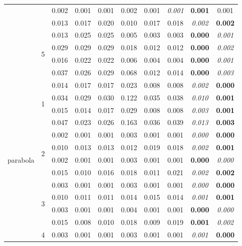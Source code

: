 \documentclass[authoryear, review, 11pt]{elsarticle}
\begin{document}
\begin{table}
\begin{center}
{\begin{tabular}{cccccccccc}
   &  & 0.002 & 0.001 & 0.001 & 0.002 & 0.001 & \emph{0.001} & \textbf{0.001} & 0.001 \\ 
   &  & 0.013 & 0.017 & 0.020 & 0.010 & 0.017 & 0.018 & \emph{0.002} & \textbf{0.002} \\ 
  \cline{3-10}
   & \multirow{4}{*}{5} & 0.013 & 0.025 & 0.025 & 0.005 & 0.003 & 0.003 & \textbf{0.000} & \emph{0.001} \\ 
   &  & 0.029 & 0.029 & 0.029 & 0.018 & 0.012 & 0.012 & \textbf{0.000} & \emph{0.002} \\ 
   &  & 0.016 & 0.022 & 0.022 & 0.006 & 0.004 & 0.004 & \textbf{0.000} & \emph{0.001} \\ 
   &  & 0.037 & 0.026 & 0.029 & 0.068 & 0.012 & 0.014 & \textbf{0.000} & \emph{0.003} \\ 
  \hline
  \multirow{20}{*}{parabola} & \multirow{4}{*}{1} & 0.014 & 0.017 & 0.017 & 0.023 & 0.008 & 0.008 & \emph{0.002} & \textbf{0.000} \\ 
   &  & 0.034 & 0.029 & 0.030 & 0.122 & 0.035 & 0.038 & \emph{0.010} & \textbf{0.001} \\ 
   &  & 0.015 & 0.014 & 0.017 & 0.029 & 0.008 & 0.008 & \emph{0.003} & \textbf{0.001} \\ 
   &  & 0.047 & 0.023 & 0.026 & 0.163 & 0.036 & 0.039 & \emph{0.013} & \textbf{0.003} \\ 
  \cline{3-10}
   & \multirow{4}{*}{2} & 0.002 & 0.001 & 0.001 & 0.003 & 0.001 & 0.001 & \emph{0.000} & \textbf{0.000} \\ 
   &  & 0.010 & 0.013 & 0.013 & 0.012 & 0.019 & 0.018 & \emph{0.002} & \textbf{0.001} \\ 
   &  & 0.002 & 0.001 & 0.001 & 0.003 & 0.001 & 0.001 & \textbf{0.000} & \emph{0.000} \\ 
   &  & 0.015 & 0.010 & 0.016 & 0.018 & 0.011 & 0.021 & \emph{0.002} & \textbf{0.002} \\ 
  \cline{3-10}
   & \multirow{4}{*}{3} & 0.003 & 0.001 & 0.001 & 0.003 & 0.001 & 0.001 & \emph{0.000} & \textbf{0.000} \\ 
   &  & 0.010 & 0.011 & 0.011 & 0.014 & 0.015 & 0.014 & \emph{0.001} & \textbf{0.001} \\ 
   &  & 0.003 & 0.001 & 0.001 & 0.004 & 0.001 & 0.001 & \textbf{0.000} & \emph{0.000} \\ 
   &  & 0.015 & 0.008 & 0.010 & 0.018 & 0.009 & 0.019 & \textbf{0.001} & \emph{0.002} \\ 
  \cline{3-10}
   & \multirow{4}{*}{4} & 0.003 & 0.001 & 0.001 & 0.003 & 0.001 & 0.001 & \emph{0.001} & \textbf{0.000} \\ 

\end{tabular}}
\end{center}
\end{table}
\end{document}
